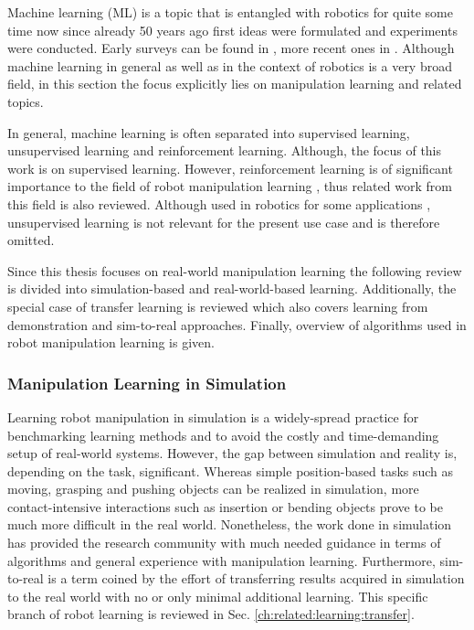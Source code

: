Machine learning (ML) is a topic that is entangled with robotics for quite some time now since already 50 years ago first ideas were formulated \cite{Fikes.1972} and experiments were conducted.
Early surveys can be found in \cite{Horne.1990,Moore.1992,Connell.1993,Bakker.1996,Kaelbling.1996,Atkeson.1997}, more recent ones in \cite{Argall.2009,Kober.2013,Arulkumaran.2017,Polydoros.2017,Zhu.2018,Nguyen.2019,Ravichandar.2020,Zhao.2020,Kroemer.2021,Cui.2021}.
Although machine learning in general as well as in the context of robotics is a very broad field, in this section the focus explicitly lies on manipulation learning and related topics.

In general, machine learning is often separated into supervised learning, unsupervised learning and reinforcement learning.
Although, the focus of this work is on supervised learning.
However, reinforcement learning is of significant importance to the field of robot manipulation learning \cite{Nguyen.2019}, thus related work from this field is also reviewed.
Although used in robotics for some applications \cite{Xiao.2015,Finn.2016,Pinto.2016,Krishnan.2017}, unsupervised learning is not relevant for the present use case and is therefore omitted.

Since this thesis focuses on real-world manipulation learning the following review is divided into simulation-based and real-world-based learning.
Additionally, the special case of transfer learning is reviewed which also covers learning from demonstration and sim-to-real approaches.
Finally, overview of algorithms used in robot manipulation learning is given.

\subsubsection{Manipulation Learning in Simulation}

Learning robot manipulation in simulation is a widely-spread practice for benchmarking learning methods and to avoid the costly and time-demanding setup of real-world systems.
However, the gap between simulation and reality is, depending on the task, significant.
Whereas simple position-based tasks such as moving, grasping and pushing objects can be realized in simulation, more contact-intensive interactions such as insertion or bending objects prove to be much more difficult in the real world.
Nonetheless, the work done in simulation has provided the research community with much needed guidance in terms of algorithms and general experience with manipulation learning.
Furthermore, sim-to-real is a term coined by the effort of transferring results acquired in simulation to the real world with no or only minimal additional learning.
This specific branch of robot learning is reviewed in Sec. \ref{ch:related:learning:transfer}.

